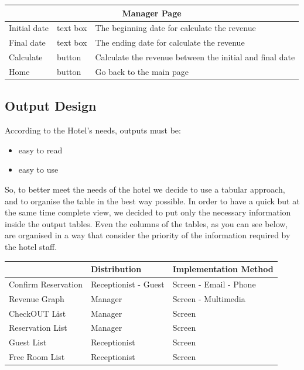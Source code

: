 \begin{center}
\begin{longtable}{| l | l | p{7cm} |}
	\hline \hline
	\multicolumn{3}{|c|}{\textbf{Manager Page}} \\
	\hline	\hline
	Initial date	& text box		& The beginning date for calculate the revenue \\
	Final date		& text box		& The ending date for calculate the revenue \\
	Calculate		& button		& Calculate the revenue between the initial and final date \\
	Home			& button		& Go back to the main page \\
	\hline
	\end{longtable}
\end{center}

\subsection{Output Design}

According to the Hotel’s needs, outputs must be:

\begin{itemize}
  \item easy to read
  \item easy to use
\end{itemize}

So, to better meet the needs of the hotel we decide to use a tabular approach, and to organise the table in the best way possible. In order to have a quick but at the same time complete view, we decided to put only the necessary information inside the output tables. Even the columns of the tables, as you can see below, are organised in a way that consider the priority of the information required by the hotel staff. 

\begin{table}[h]
\begin{tabular}{|l|l|l|}
\hline
                    & Distribution         & Implementation Method  \\ \hline
Confirm Reservation & Receptionist - Guest & Screen - Email - Phone \\ \hline
Revenue Graph       & Manager              & Screen - Multimedia    \\ \hline
CheckOUT List       & Manager              & Screen                 \\ \hline
Reservation List    & Manager              & Screen                 \\ \hline
Guest List          & Receptionist         & Screen                 \\ \hline
Free Room List      & Receptionist         & Screen                 \\ \hline
\end{tabular}
\end{table}

